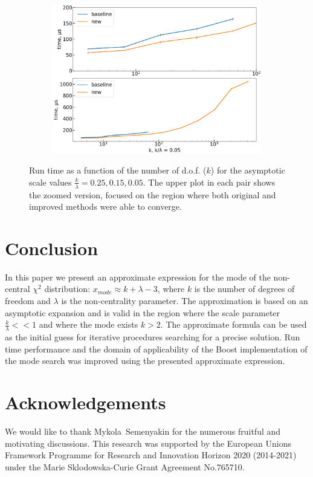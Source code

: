 \documentclass[final,5p,twocolumn,times,authoryear]{elsarticle}
\begin{document}
\begin{figure}[t]
\begin{subfigure}[t]{0.46\textwidth}
		\includegraphics[width=\linewidth]{boost_scale_fixed_0_05.png}
		\caption{}
	\end{subfigure}
	\caption{Run time as a function of the number of d.o.f. ($k$) for the asymptotic scale values $\frac{k}{\lambda}=0.25,0.15,0.05$. The upper plot in each pair shows the zoomed version, focused on the region where both original and improved methods were able to converge.}\label{fig:boost-lam-fixed}
\end{figure}

\section{Conclusion}
In this paper we present an approximate expression for the mode of the non-central $\chi^2$ distribution: $x_{mode} \approx k + \lambda - 3$, where $k$ is the number of degrees of freedom and $\lambda$ is the non-centrality parameter. The approximation is based on an asymptotic expansion and is valid in the region where the scale parameter $\frac{k}{\lambda} << 1$ and where the mode exists $k > 2$. The approximate formula can be used as the initial guess for iterative procedures searching for a precise solution. Run time performance and the domain of applicability of the Boost implementation of the mode search was improved using the presented approximate expression.

\section{Acknowledgements}

We would like to thank Mykola~Semenyakin for the numerous fruitful and motivating discussions. This research was supported by the European Unions Framework Programme for Research and Innovation Horizon 2020 (2014-2021) under the Marie Sklodowska-Curie Grant Agreement No.765710.



\end{document}
